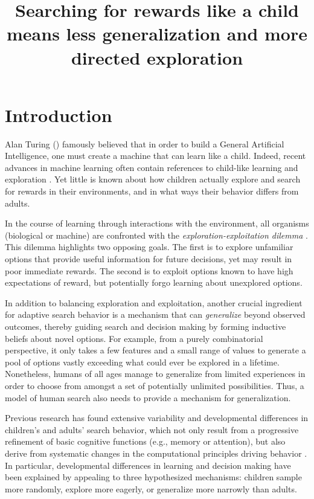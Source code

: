 \documentclass[a4paper,man, floatsintext, natbib]{apa6}
\title{\textbf{Searching for rewards like a child means less generalization and more directed exploration}}
\begin{document}
\maketitle

\section{Introduction}

Alan Turing (\citeyear{turing1950computing}) famously believed that in order to build a General Artificial Intelligence, one must create a machine that can learn like a child. Indeed, recent advances in machine learning often contain references to child-like learning and exploration \citep{riedmiller2018learning}. Yet little is known about how children actually explore and search for rewards in their environments, and in what ways their behavior differs from adults.

In the course of learning through interactions with the environment, all organisms (biological or machine) are confronted with the \emph{exploration-exploitation dilemma} \citep{mehlhorn2015unpacking}. This dilemma highlights two opposing goals. The first is to explore unfamiliar options that provide useful information for future decisions, yet may result in poor immediate rewards. The second is to exploit options known to have high expectations of reward, but potentially forgo learning about unexplored options. 

In addition to balancing exploration and exploitation, another crucial ingredient for adaptive search behavior is a mechanism that can \emph{generalize} beyond observed outcomes, thereby guiding search and decision making by forming inductive beliefs about novel options. For example, from a purely combinatorial perspective, it only takes a few features and a small range of values to generate a pool of options vastly exceeding what could ever be explored in a lifetime. Nonetheless, humans of all ages manage to generalize from limited experiences in order to choose from amongst a set of potentially unlimited possibilities. Thus, a model of human search also needs to provide a mechanism for generalization. 

Previous research has found extensive variability and developmental differences in children's and adults' search behavior, which not only result from a progressive refinement of basic cognitive functions (e.g., memory or attention), but also derive from systematic changes in the computational principles driving behavior \citep{palminteri2016computational}. In particular, developmental differences in learning and decision making have been explained by appealing to three hypothesized mechanisms: children sample more randomly, explore more eagerly, or generalize more narrowly than adults.
\end{document}
